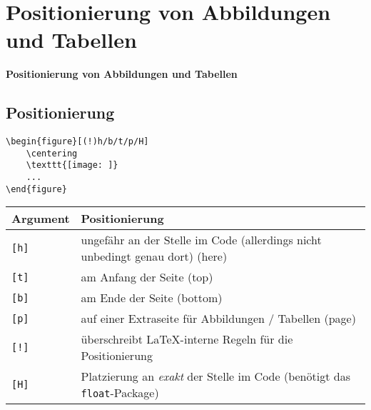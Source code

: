 \section{Positionierung von Abbildungen und Tabellen}
\begin{frame}[c]
	\begin{center}
		\LARGE \textbf{Positionierung von Abbildungen und Tabellen}
	\end{center}
\end{frame}
\subsection*{Positionierung}
\begin{frame}[fragile]
	\begin{lstlisting}
\begin{figure}[(!)h/b/t/p/H]
	\centering
	\texttt{[image: ]}
	...
\end{figure}
	\end{lstlisting}
	
	\btVFill\Befehle
	\begin{center}
		\begin{tabular}{l p{6cm} }
			\toprule
			Argument		&	Positionierung																			\\ \midrule
			\lstinline|[h]|	&	ungefähr an der Stelle im Code (allerdings nicht unbedingt genau dort) (here)			\\
			\lstinline|[t]|	&	am Anfang der Seite (top)																\\
			\lstinline|[b]|	&	am Ende der Seite (bottom)																\\
			\lstinline|[p]|	&	auf einer Extraseite für Abbildungen / Tabellen (page)									\\
			\lstinline|[!]|	&	überschreibt \LaTeX-interne Regeln für die Positionierung								\\
			\lstinline|[H]|	&	Platzierung an \emph{exakt} der Stelle im Code (benötigt das \texttt{float}-Package)	\\
			\bottomrule
		\end{tabular}
	\end{center}
	\vspace{0.1cm}
\end{frame}